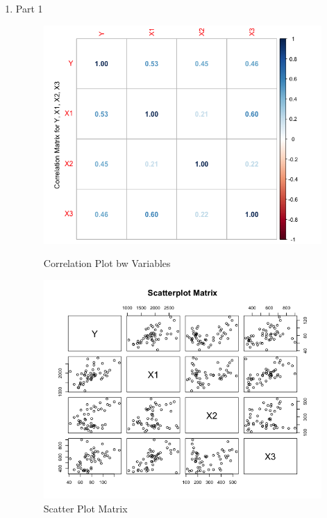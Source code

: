 \documentclass[12pt,letterpaper]{article}
\begin{document}
\begin{enumerate}
    \item Part 1

    


  \begin{figure}[h]
     \centering
       \begin{minipage}{.5\textwidth}
         \centering
           \includegraphics[width=\textwidth]{images/correlationmatrix_question1_part1.png}
          \caption{Correlation Plot bw Variables}
     \end{minipage}%
    \begin{minipage}{.45\textwidth}
       \centering
        \includegraphics[width=\textwidth]{images/scatterplot_question2_part1.png}
         \caption{Scatter Plot Matrix}
       \end{minipage}
      \end{figure}



\end{enumerate}
\end{document}
